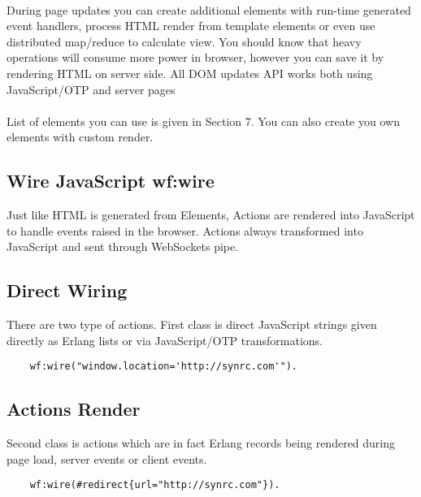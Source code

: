 \paragraph{}
During page updates you can create additional elements with
run-time generated event handlers, process HTML render from
template elements or even use distributed map/reduce to calculate view.
You should know that heavy operations will consume
more power in browser, however you can save it by rendering
HTML on server side. All DOM updates API works both using
JavaScript/OTP and server pages 

\paragraph{}
List of elements you can use is given in Section 7. You can also create
you own elements with custom render.

\newpage
\subsection{Wire JavaScript \bf{wf:wire}}
Just like HTML is generated from Elements, Actions are rendered into
JavaScript to handle events raised in the browser. Actions always
transformed into JavaScript and sent through WebSockets pipe.

\subsection*{Direct Wiring}
There are two type of actions. First class is direct JavaScript
strings given directly as Erlang lists or via JavaScript/OTP
transformations.

\vspace{1\baselineskip}
\begin{lstlisting}
    wf:wire("window.location='http://synrc.com'").
\end{lstlisting}

\subsection*{Actions Render}
Second class is actions which are in fact Erlang records being
rendered during page load, server events or client events.

\vspace{1\baselineskip}
\begin{lstlisting}
    wf:wire(#redirect{url="http://synrc.com"}).
\end{lstlisting}
\vspace{1\baselineskip}

